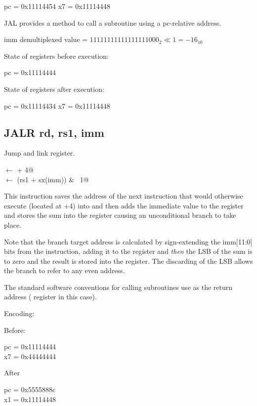 pc = 0x11114454
x7 = 0x11114448

JAL provides a method to call a subroutine using a pc-relative address.



imm demultiplexed value = $11111111111111111000_2 \ll 1 = -16_{10}$

State of registers before execution:

pc = 0x11114444

State of registers after execution:

pc = 0x11114434
x7 = 0x11114448


\subsection{JALR rd, rs1, imm}

Jump and link register.

\verb@rd@ $\leftarrow$ \verb@pc + 4@\\
\verb@pc@ $\leftarrow$ \verb@(rs1 + sx(imm)) & ~1@

This instruction saves the address of the next instruction
that would otherwise execute (located at +4) into 
 and then adds the immediate value to the  
register and stores the sum into the  register causing
an unconditional branch to take place.

Note that the branch target address is calculated by 
sign-extending the imm[11:0] bits from the instruction, 
adding it to the  register and {\em then} the 
LSB of the sum is to zero and the result is stored into the 
 register.
The discarding of the LSB allows the branch to refer to any 
even address.

The standard software conventions for calling subroutines
use  as the return address ( register in this 
case).~\cite[p.~16]{rvismv1v22:2017}


Encoding:


Before:

pc = 0x11114444\\
x7 = 0x44444444

After

pc = 0x5555888c\\
x1 = 0x11114448

